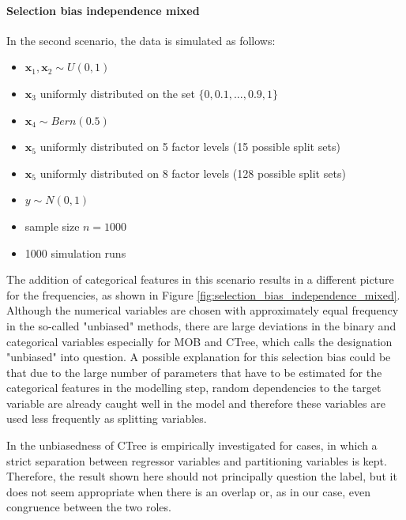 \paragraph{Selection bias independence mixed \newline} 
In the second scenario, the data is simulated as follows:
\begin{itemize}
    \item $\textbf{x}_{1}, \textbf{x}_{2} \sim U(0,1)$ 
    \item $\textbf{x}_3$ uniformly distributed on the set $\{0, 0.1,..., 0.9, 1\}$ 
    \item $\textbf{x}_4  \sim Bern(0.5)$ 
    \item $\textbf{x}_5$ uniformly distributed on 5 factor levels (15 possible split sets) 
    \item $\textbf{x}_5$ uniformly distributed on 8 factor levels (128 possible split sets) %
    \item $y \sim N(0,1)$
    \item sample size $n = 1000$
    \item 1000 simulation runs
\end{itemize}

The addition of categorical features in this scenario results in a different picture for the frequencies, as shown in Figure \ref{fig:selection_bias_independence_mixed}. Although the numerical variables are chosen with approximately equal frequency in the so-called "unbiased" methods, there are large deviations in the binary and categorical variables especially for MOB and CTree, which calls the designation "unbiased" into question. 
A possible explanation for this selection bias could be that due to the large number of parameters that have to be estimated for the categorical features in the modelling step, random dependencies to the target variable are already caught well in the model  and therefore these variables are used less frequently as splitting variables.


In \citep{Hothorn.2006} the unbiasedness of CTree is empirically investigated for cases, in which a strict separation between regressor variables and partitioning variables is kept. Therefore, the result shown here should not principally question the label, but it does not seem appropriate when there is an overlap or, as in our case, even congruence between the two roles.



